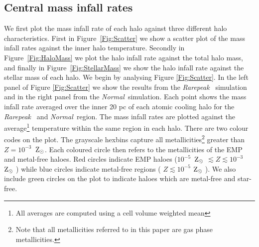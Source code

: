 \documentclass[graphics, twocolumn, usenatbib]{mn2e}
\newcommand{\zsolar} {$\rm{Z_{\odot}}~$}
\newcommand{\zsolarc} {$\rm{Z_{\odot}}$}
\newcommand{\rarepeak} {\textit{Rarepeak~}}
\newcommand{\normal} {\textit{Normal~}}
\begin{document}
\subsection{Central mass infall rates}

\indent We first plot the mass infall rate of each halo against three different halo
characteristics. First in Figure~\ref{Fig:Scatter} we show a scatter plot of the mass infall rates
against the inner halo temperature. Secondly in Figure~\ref{Fig:HaloMass} we plot the halo infall
rate against the total halo mass, and finally in Figure~\ref{Fig:StellarMass} we show the halo
infall rate against the stellar mass of each halo. We begin by analysing Figure \ref{Fig:Scatter}. 
In the left panel of Figure \ref{Fig:Scatter} we show the results from the \rarepeak
simulation and in the right panel from the \normal simulation. Each point shows the mass
infall rate averaged over the inner 20 pc of each atomic cooling halo for the \rarepeak
and \normal region. The mass infall rates are plotted against the average\footnote{All
  averages are computed using a cell volume weighted mean} temperature within
the same region in each halo. There are two colour codes on the plot. The grayscale
hexbins capture all metallicities\footnote{Note that all metallicities
  referred to in this paper are gas phase metallicities.}
greater than $Z = 10^{-3}$~\zsolarc. Each coloured circle then refers to
the metallicities of the EMP and metal-free haloes. Red circles indicate EMP haloes
 ($10^{-5}$~\zsolar $ \lesssim Z \lesssim 10^{-3}$~\zsolar )
while blue circles indicate metal-free regions  ( $Z \lesssim 10^{-5}$ \zsolar ). We also
include green circles on the plot to indicate haloes which are metal-free and star-free. 
\end{document}
